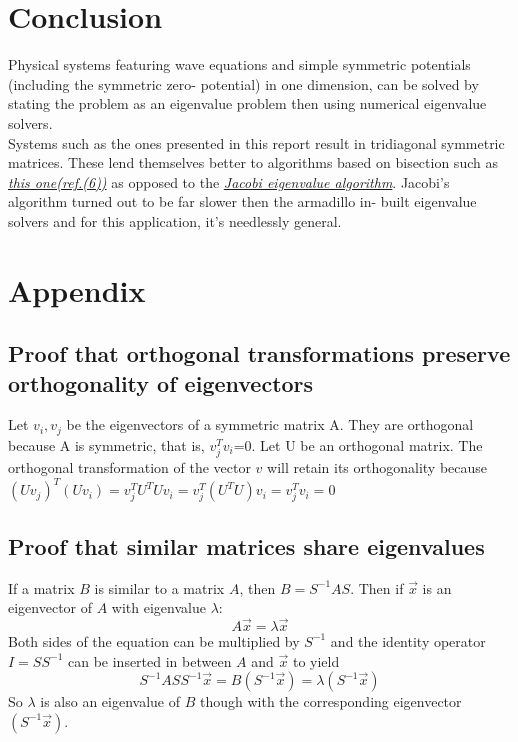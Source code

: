 \documentclass[10pt,a4paper]{article}
\begin{document}
\section{Conclusion}
Physical systems featuring wave equations and simple symmetric potentials (including the symmetric zero- potential) in one dimension, can be solved by stating the problem as an eigenvalue problem then using numerical eigenvalue solvers.\\Systems such as the ones presented in this report result in tridiagonal symmetric matrices. These lend themselves better to algorithms based on bisection such as \hyperref[method by bisection]{\emph{this one(ref.(6))}} as opposed to the \hyperref[jacobi algo]{\emph{Jacobi eigenvalue algorithm}}. Jacobi's algorithm turned out to be far slower then the armadillo in- built eigenvalue solvers and for this application, it's needlessly general.

\section{Appendix}
\subsection{Proof that orthogonal transformations preserve orthogonality of eigenvectors}\label{eigenvector orthogonality}
Let $v_i, v_j$ be the eigenvectors of a symmetric matrix A. They are orthogonal because A is symmetric, that is, $v_{j}^Tv_i$=0. Let U be an orthogonal matrix. The orthogonal transformation of the vector $v$ will retain its orthogonality because
 $(Uv_j)^T(Uv_i)=v_{j}^TU^TUv_i=v_{j}^T(U^TU)v_i=v_{j}^Tv_i=0$
\subsection{Proof that similar matrices share eigenvalues}\label{proof of same eigenvalues}
If a matrix $B$ is similar to a matrix $A$, then $B=S^{-1}AS$. Then if $\vec{x}$ is an eigenvector of $A$ with eigenvalue $\lambda$:
$$
A\vec{x}=\lambda\vec{x}
$$
Both sides of the equation can be multiplied by $S^{-1}$ and the identity operator $I = SS^{-1}$ can be inserted in between $A$ and $\vec{x}$ to yield
$$
S^{-1}ASS^{-1}\vec{x} =B\left(S^{-1}\vec{x}\right)= \lambda \left( S^{-1}\vec{x}\right)
$$
So $\lambda$ is also an eigenvalue of $B$ though with the corresponding eigenvector $\left( S^{-1}\vec{x}\right)$.
\end{document}
